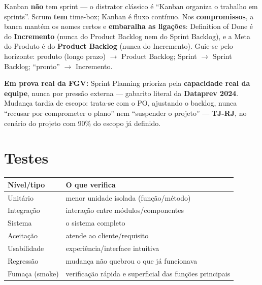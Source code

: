 \begin{pegadinha}
Kanban \textbf{não} tem sprint --- o distrator clássico é ``Kanban organiza o
trabalho em sprints''. Scrum \textbf{tem} time-box; Kanban é fluxo contínuo.
Nos \textbf{compromissos}, a banca mantém os nomes certos e \textbf{embaralha
as ligações}: Definition of Done é do \textbf{Incremento} (nunca do Product
Backlog nem do Sprint Backlog), e a Meta do Produto é do \textbf{Product
Backlog} (nunca do Incremento). Guie-se pelo horizonte: produto (longo prazo)
$\to$ Product Backlog; Sprint $\to$ Sprint Backlog; ``pronto'' $\to$
Incremento.
\end{pegadinha}

\begin{jacaiu}
\textbf{Em prova real da FGV:} Sprint Planning prioriza pela
\textbf{capacidade real da equipe}, nunca por pressão externa --- gabarito
literal da \textbf{Dataprev 2024}. Mudança tardia de escopo: trata-se com o
PO, ajustando o backlog, nunca ``recusar por comprometer o plano'' nem
``suspender o projeto'' --- \textbf{TJ-RJ}, no cenário do projeto com 90\% do
escopo já definido.
\end{jacaiu}

\section{Testes}

\begin{center}
\begin{tabular}{@{}p{3cm}p{9.2cm}@{}}
\toprule
\textbf{Nível/tipo} & \textbf{O que verifica} \\
\midrule
Unitário & menor unidade isolada (função/método) \\
Integração & interação entre módulos/componentes \\
Sistema & o sistema completo \\
Aceitação & atende ao cliente/requisito \\
Usabilidade & experiência/interface intuitiva \\
Regressão & mudança não quebrou o que já funcionava \\
Fumaça (smoke) & verificação rápida e superficial das funções principais \\
\bottomrule
\end{tabular}
\end{center}

